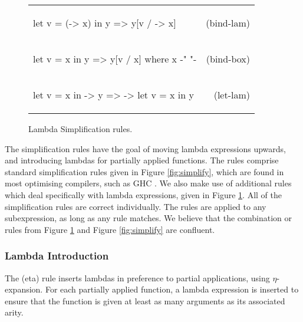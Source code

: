 \documentclass[preprint]{sigplanconf}
\newcommand{\simp}[2]{\begin{minipage}{6.4cm}#2\end{minipage} & (#1) \\}
\newenvironment{simplify}
    {\noindent
     \begin{flushright}
     \begin{tabular}{p{6.5cm}r}
    }
    {\end{tabular}
     \end{flushright}
    }
\begin{document}
\begin{figure}
\begin{simplify}

\simp{bind-lam}{
\ignore\begin{code}
let v = (\w -> x) in y
    => y[v / \w -> x]
\end{code}}

\simp{bind-box}{
\ignore\begin{code}
let v = x in y
    => y[v / x]
    where x {-" \text{ is a boxed lambda (see \S\ref{sec:inlining})} "-}
\end{code}}

\simp{let-lam}{
\ignore\begin{code}
let v = x in \w -> y
    => \w -> let v = x in y
\end{code}}

\end{simplify}
\caption{Lambda Simplification rules.}
\label{fig:lambda_simplify}
\end{figure}

The simplification rules have the goal of moving lambda expressions upwards, and introducing lambdas for partially applied functions. The rules comprise standard simplification rules given in Figure \ref{fig:simplify}, which are found in most optimising compilers, such as GHC \cite{spj:transformation}. We also make use of additional rules which deal specifically with lambda expressions, given in Figure \ref{fig:lambda_simplify}. All of the simplification rules are correct individually. The rules are applied to any subexpression, as long as any rule matches. We believe that the combination or rules from Figure \ref{fig:lambda_simplify} and Figure \ref{fig:simplify} are confluent.

\subsubsection{Lambda Introduction}

The (eta) rule inserts lambdas in preference to partial applications, using $\eta$-expansion. For each partially applied function, a lambda expression is inserted to ensure that the function is given at least as many arguments as its associated arity.
\end{document}
